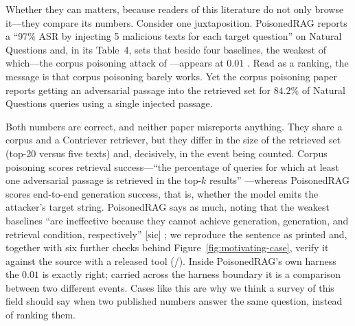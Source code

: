 \documentclass[11pt]{article}
\begin{document}
Whether they can matters, because readers of this literature do not only browse it---they
compare its numbers. Consider one juxtaposition. PoisonedRAG reports a ``97\% ASR by
injecting 5 malicious texts for each target question'' on Natural Questions and, in its
Table~4, sets that beside four baselines, the weakest of which---the corpus poisoning attack
of \citet{poisoningRetrievalCorpora2023}---appears at $0.01$ \citep{poisonedRAG2024}. Read as
a ranking, the message is that corpus poisoning barely works. Yet the corpus poisoning paper
reports getting an adversarial passage into the retrieved set for $84.2\%$ of Natural
Questions queries using a single injected passage.



Both numbers are correct, and neither paper misreports anything. They share a corpus and a
Contriever retriever, but they differ in the size of the retrieved set (top-20 versus five
texts) and, decisively, in the event being counted. Corpus poisoning scores retrieval
success---``the percentage of queries for which at least one adversarial passage is retrieved
in the top-$k$ results'' \citep[l.~333--337]{poisoningRetrievalCorpora2023}---whereas
PoisonedRAG scores end-to-end generation success, that is, whether the model emits the
attacker's target string. PoisonedRAG says as much, noting that the weakest baselines ``are
ineffective because they cannot achieve generation, generation, and retrieval condition,
respectively'' [sic] \citep[l.~1338--1341]{poisonedRAG2024}; we reproduce the sentence as
printed and, together with six further checks behind Figure~\ref{fig:motivating-case}, verify
it against the source with a released tool (\MotivPassed{}/\MotivChecks{}). Inside
PoisonedRAG's own harness the $0.01$ is exactly right; carried across the harness boundary it
is a comparison between two different events. Cases like this are why we think a survey of
this field should say when two published numbers answer the same question, instead of ranking
them.
\end{document}

